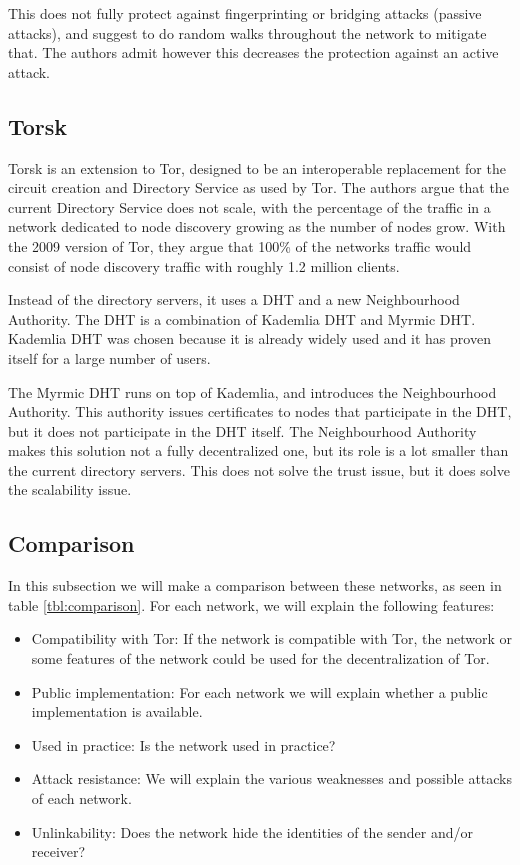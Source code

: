 \documentclass{article}
\begin{document}
		This does not fully protect against fingerprinting or bridging attacks (passive attacks), and suggest to do random walks throughout the network to mitigate that. The authors admit however this decreases the protection against an active attack.
		
	\subsection{Torsk} %
		Torsk \cite{mclachlan2009scalable} is an extension to Tor, designed to be an interoperable replacement for the circuit creation and Directory Service as used by Tor. The authors argue that the current Directory Service does not scale, with the percentage of the traffic in a network dedicated to node discovery growing as the number of nodes grow. With the 2009 version of Tor, they argue that 100\% of the networks traffic would consist of node discovery traffic with roughly 1.2 million clients. 
		
		Instead of the directory servers, it uses a DHT and a new Neighbourhood Authority. The DHT is a combination of Kademlia DHT and Myrmic DHT. Kademlia DHT was chosen because it is already widely used and it has proven itself for a large number of users.
		
		The Myrmic DHT runs on top of Kademlia, and introduces the Neighbourhood Authority. This authority issues certificates to nodes that participate in the DHT, but it does not participate in the DHT itself. The Neighbourhood Authority makes this solution not a fully decentralized one, but its role is a lot smaller than the current directory servers. This does not solve the trust issue, but it does solve the scalability issue.

	\subsection{Comparison}
		In this subsection we will make a comparison between these networks, as seen in table \ref{tbl:comparison}. For each network, we will explain the following features:
	
		\begin{itemize}
			\item{Compatibility with Tor:} If the network is compatible with Tor, the network or some features of the network could be used for the decentralization of Tor.
			\item{Public implementation:} For each network we will explain whether a public implementation is available.
			\item{Used in practice:} Is the network used in practice?
			\item{Attack resistance:} We will explain the various weaknesses and possible attacks of each network.
			\item{Unlinkability:} Does the network hide the identities of the sender and/or receiver?
		\end{itemize}
		
\end{document}

